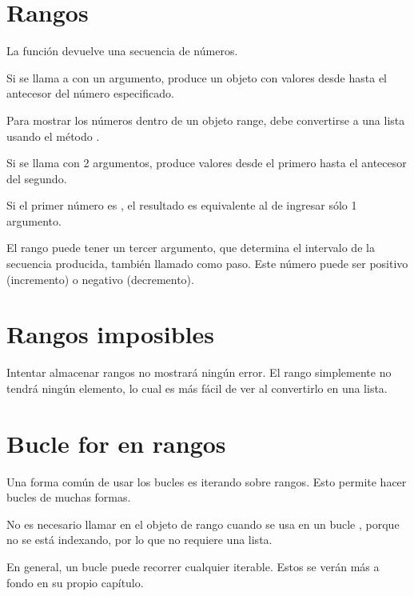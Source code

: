 \section{Rangos}

La función  devuelve una secuencia de números.

Si se llama a  con un argumento, produce un objeto con valores desde  hasta el antecesor del número especificado.


Para mostrar los números dentro de un objeto range, debe convertirse a una lista usando el método .


Si se llama con 2 argumentos, produce valores desde el primero hasta el antecesor del segundo.


Si el primer número es , el resultado es equivalente al de ingresar sólo 1 argumento.


El rango puede tener un tercer argumento, que determina el intervalo de la secuencia producida, también llamado como paso.
Este número puede ser positivo (incremento) o negativo (decremento).


\section{Rangos imposibles}

Intentar almacenar rangos  no mostrará ningún error.
El rango simplemente no tendrá ningún elemento, lo cual es más fácil de ver al convertirlo en una lista.


\section{Bucle for en rangos}

Una forma común de usar los bucles  es iterando sobre rangos.
Esto permite hacer bucles de muchas formas.


No es necesario llamar  en el objeto de rango cuando se usa en un bucle , porque no se está indexando, por lo que no requiere una lista.

En general, un bucle  puede recorrer cualquier iterable.
Estos se verán más a fondo en su propio capítulo.

\clearpage